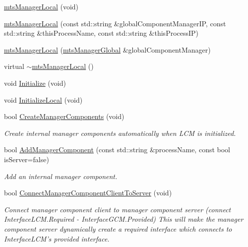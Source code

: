 \begin{DoxyCompactItemize}
\item 
\hyperlink{classmts_manager_local_ae66b56b5f888842932ddd12d17adc8bb}{mts\-Manager\-Local} (void)
\item 
\hyperlink{classmts_manager_local_ac5a8372120fa1f883e5211f580b34536}{mts\-Manager\-Local} (const std\-::string \&global\-Component\-Manager\-I\-P, const std\-::string \&this\-Process\-Name, const std\-::string \&this\-Process\-I\-P)
\item 
\hyperlink{classmts_manager_local_a430160ea25a0dcc74c0208c4a872f8e6}{mts\-Manager\-Local} (\hyperlink{classmts_manager_global}{mts\-Manager\-Global} \&global\-Component\-Manager)
\item 
virtual \hyperlink{classmts_manager_local_a6f8d41b93110fd568984e64a2986d670}{$\sim$mts\-Manager\-Local} ()
\item 
void \hyperlink{classmts_manager_local_af5a33b217d47019766d3e2f0829c46bf}{Initialize} (void)
\item 
void \hyperlink{classmts_manager_local_a4f53f4cb51556279f988779e68279444}{Initialize\-Local} (void)
\item 
bool \hyperlink{classmts_manager_local_a618393b6dc9bf576d61ff846bc19cb8c}{Create\-Manager\-Components} (void)
\begin{DoxyCompactList}\small\item\em Create internal manager components automatically when L\-C\-M is initialized. \end{DoxyCompactList}\item 
bool \hyperlink{classmts_manager_local_a7919800d7447c0a66251e9efb6e7df52}{Add\-Manager\-Component} (const std\-::string \&process\-Name, const bool is\-Server=false)
\begin{DoxyCompactList}\small\item\em Add an internal manager component. \end{DoxyCompactList}\item 
bool \hyperlink{classmts_manager_local_a9a93bee9a7ba00ef62eb41636a55685d}{Connect\-Manager\-Component\-Client\-To\-Server} (void)
\begin{DoxyCompactList}\small\item\em Connect manager component client to manager component server (connect Interface\-L\-C\-M.\-Required -\/ Interface\-G\-C\-M.\-Provided) This will make the manager component server dynamically create a required interface which connects to Interface\-L\-C\-M's provided interface. \end{DoxyCompactList}\item 

\end{DoxyCompactItemize}
